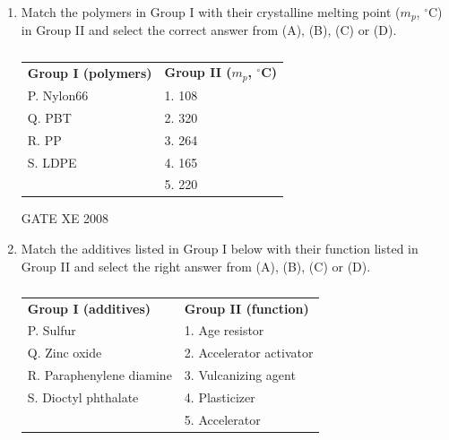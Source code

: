 \documentclass[12pt]{article}
\begin{document}
\begin{enumerate}[label=Q\arabic*.]
\item Match the polymers in Group I with their crystalline melting point ($m_p$, $^\circ$C) in Group II and select the correct answer from (A), (B), (C) or (D).

\begin{table}[H]     \centering     \caption{}     \label{}     \begin{tabular}{l l}
\textbf{Group I (polymers)} & \textbf{Group II ($m_p$, $^\circ$C)} \\
P. Nylon66 & 1. 108 \\
Q. PBT & 2. 320 \\
R. PP & 3. 264 \\
S. LDPE & 4. 165 \\
& 5. 220 \\
\end{tabular} \end{table}

\begin{enumerate}[label=(\Alph*)]
\end{enumerate}

GATE XE 2008

\item Match the additives listed in Group I below with their function listed in Group II and select the right answer from (A), (B), (C) or (D).

\begin{table}[H]     \centering     \caption{}     \label{}     \begin{tabular}{l l}
\textbf{Group I (additives)} & \textbf{Group II (function)} \\
P. Sulfur & 1. Age resistor \\
Q. Zinc oxide & 2. Accelerator activator \\
R. Paraphenylene diamine & 3. Vulcanizing agent \\
S. Dioctyl phthalate & 4. Plasticizer \\
& 5. Accelerator \\
\end{tabular} \end{table}

\begin{enumerate}[label=(\Alph*)]
\end{enumerate}


\end{enumerate}
\end{document}
